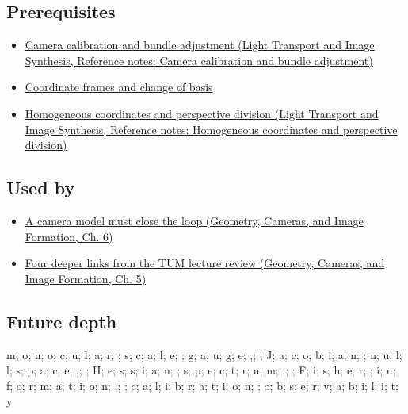\subsection{Prerequisites}\label{appendix-113f0267e5f4-prerequisites}

\begin{itemize}
\tightlist
\item
  \href{../04-Light-Transport-and-Image-Synthesis/main.pdf\#nameddest=appendix-3ee9861904d5}{Camera calibration and bundle adjustment (Light Transport and Image Synthesis, Reference notes: Camera calibration and bundle adjustment)}
\item
  \hyperref[appendix-1bae9457dbc3]{Coordinate frames and change of basis}
\item
  \href{../04-Light-Transport-and-Image-Synthesis/main.pdf\#nameddest=appendix-cb3b26862282}{Homogeneous coordinates and perspective division (Light Transport and Image Synthesis, Reference notes: Homogeneous coordinates and perspective division)}
\end{itemize}

\subsection{Used by}\label{appendix-113f0267e5f4-used-by}

\begin{itemize}
\tightlist
\item
  \href{../03-Geometry-Cameras-and-Image-Formation/main.pdf\#nameddest=02-foundations-ii-ch037-a-camera-model-must-close-the-loop}{A camera model must close the loop (Geometry, Cameras, and Image Formation, Ch. 6)}
\item
  \href{../03-Geometry-Cameras-and-Image-Formation/main.pdf\#nameddest=02-foundations-ii-ch036-four-deeper-links-from-the-tum-lecture-review}{Four deeper links from the TUM lecture review (Geometry, Cameras, and Image Formation, Ch. 5)}
\end{itemize}

\subsection{Future depth}\label{appendix-113f0267e5f4-future-depth}

m; o; n; o; c; u; l; a; r; ; s; c; a; l; e; ; g; a; u; g; e; ,; ; J; a; c; o; b; i; a; n; ; n; u; l; l; s; p; a; c; e; ,; ; H; e; s; s; i; a; n; ; s; p; e; c; t; r; u; m; ,; ; F; i; s; h; e; r; ; i; n; f; o; r; m; a; t; i; o; n; ,; ; c; a; l; i; b; r; a; t; i; o; n; ; o; b; s; e; r; v; a; b; i; l; i; t; y
